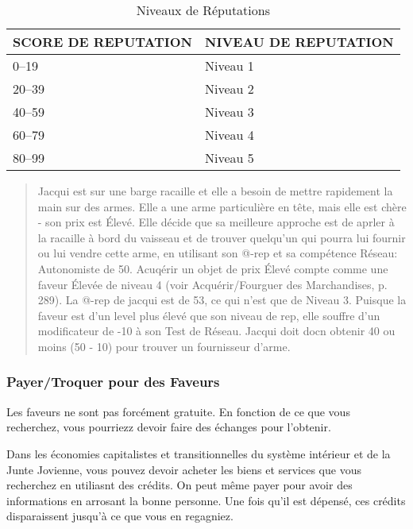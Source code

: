 \begin{table} \caption{Niveaux de Réputations} \begin{tabular}{|l|l|} \hline

SCORE DE REPUTATION &NIVEAU DE REPUTATION \\ \hline

0–19 &Niveau 1 \\ \hline

20–39 &Niveau 2 \\ \hline

40–59 &Niveau 3 \\ \hline

60–79 &Niveau 4 \\ \hline

80–99 &Niveau 5 \\ \hline

\end{tabular} \end{table} 

\begin{quotation} Jacqui est sur une barge racaille et elle a besoin de mettre rapidement la main sur des armes. Elle a une arme particulière en tête, mais elle est chère - son prix est Élevé. Elle décide que sa meilleure approche est de aprler à la racaille à bord du vaisseau et de trouver quelqu'un qui pourra lui fournir ou lui vendre cette arme, en utilisant son @-rep et sa compétence Réseau: Autonomiste de 50. Acuqérir un objet de prix Élevé compte comme une faveur Élevée de niveau 4 (voir Acquérir/Fourguer des Marchandises, p. 289). La @-rep de jacqui est de 53, ce qui n'est que de Niveau 3. Puisque la faveur est d'un level plus élevé que son niveau de rep, elle souffre d'un modificateur de -10 à son Test de Réseau. Jacqui doit docn obtenir 40 ou moins (50 - 10) pour trouver un fournisseur d'arme. \end{quotation} 

\subsubsection{Payer/Troquer pour des Faveurs} 

Les faveurs ne sont pas forcément gratuite. En fonction de ce que vous recherchez, vous pourriezz devoir faire des échanges pour l'obtenir. 

Dans les économies capitalistes et transitionnelles du système intérieur et de la Junte Jovienne, vous pouvez devoir acheter les biens et services que vous recherchez en utiliasnt des crédits. On peut même payer pour avoir des informations en arrosant la bonne personne. Une fois qu'il est dépensé, ces crédits disparaissent jusqu'à ce que vous en regagniez. 

